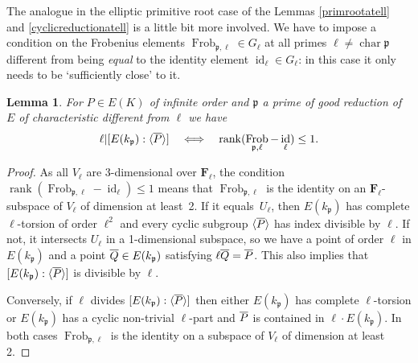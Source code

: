 \documentclass{amsart}
\theoremstyle{plain}
\newtheorem{lemma}[theorem]{Lemma}
\theoremstyle{definition}
\DeclareMathOperator{\characteristic}{char}
\DeclareMathOperator{\Frob}{Frob}
\DeclareMathOperator{\id}{id}
\DeclareMathOperator{\rank}{rank}
\newcommand{\FF}{{\mathbf{F}}}
\newcommand{\gothp}{{\mathfrak{p}}}
\newcommand{\mybar}[1]{
  \mathchoice
  {#1\llap{$\overline{\phantom{\displaystyle\rm#1}}$}}
  {#1\llap{$\overline{\phantom{\textstyle\rm#1}}$}}
  {#1\llap{$\overline{\phantom{\scriptstyle\rm#1}}$}}
  {#1\llap{$\overline{\phantom{\scriptscriptstyle\rm#1}}$}}
}
\renewcommand{\bar}{\mybar}
\begin{document}
The analogue in the elliptic primitive root case of the 
Lemmas \ref{primrootatell} and \ref{cyclicreductionatell}
is a little bit more involved.
We have to impose a condition on the Frobenius elements 
$\Frob_{\gothp, \ell}\in G_\ell$ at all primes $\ell\ne\characteristic{\gothp}$
different from being \emph{equal} to the identity element $\id_\ell\in G_\ell$: 
in this case it only needs to be `sufficiently close' to it.
\begin{lemma}
\label{ellprimrootatatell}
For $P\in E(K)$ of infinite order and $\gothp$ a prime of good reduction of~$E$ of characteristic different from $\ell$ we have 
\[
\ell | [E(k_\gothp):\langle {\bar P}\rangle ]
\quad \Longleftrightarrow \quad 
\rank (\Frob_{\gothp,\ell} - \id_\ell)\le 1.
\]
\end{lemma}
\begin{proof}
As all $V_\ell$ are 3-dimensional over $\FF_\ell$, the condition $\rank (\Frob_{\gothp,\ell} - \id_\ell)\le 1$
means that $\Frob_{\gothp,\ell}$ is the identity on an $\FF_\ell$-subspace of $V_\ell$ of dimension at least~2.
If it equals~$U_\ell$, then $E(k_\gothp)$ has complete $\ell$-torsion 
of order $\ell^2$ and every cyclic subgroup $\langle {\bar P}\rangle$ has index divisible by $\ell$.
If not, it intersects $U_\ell$ in a 1-dimensional subspace, so we have a point of order $\ell$ 
in $E(k_\gothp)$ and a point $\bar Q\in E(k_\gothp)$ satisfying $\ell\bar Q=\bar P$.
This also implies that $[E(k_\gothp):\langle {\bar P}\rangle]$ is divisible by $\ell$.

Conversely, if $\ell$ divides $[E(k_\gothp):\langle {\bar P}\rangle]$ then either 
$E(k_\gothp)$ has complete $\ell$-torsion or $E(k_\gothp)$ has a cyclic non-trivial $\ell$-part and
$\bar P$ is contained in $\ell\cdot E(k_\gothp)$. 
In both cases $\Frob_{\gothp,\ell}$ is the identity on a subspace of $V_\ell$ of dimension at least 2.
\end{proof}
\end{document}
